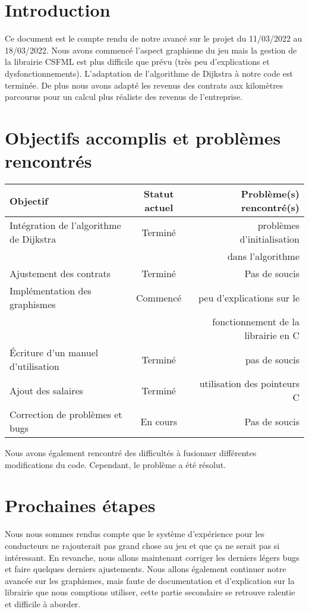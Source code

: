 \documentclass[a4paper, 12pt]{article}
\begin{document}
\newpage



\section*{Introduction}
      Ce document est le compte rendu de notre avancé sur le projet du 11/03/2022 au 18/03/2022. Nous avons commencé l'aspect graphisme du jeu mais la gestion de la librairie CSFML est plus difficile que prévu (très peu d'explications et dysfonctionnements). L'adaptation de l'algorithme de Dijkstra à notre code est terminée. De plus nous avons adapté les revenus des contrats aux kilomètres parcourus pour un calcul plus réaliste des revenus de l'entreprise.

\section{Objectifs accomplis et problèmes rencontrés}
     \begin{tabular}{|l|c|r|}
  \hline
  Objectif & Statut actuel & Problème(s) rencontré(s) \\
  \hline
   Intégration de l'algorithme de Dijkstra & Terminé & problèmes d'initialisation \\
   & & dans l'algorithme\\
   Ajustement des contrats & Terminé & Pas de soucis\\
   Implémentation des graphismes & Commencé & peu d'explications sur le \\
   & & fonctionnement de la librairie en C\\
   Écriture d'un manuel d'utilisation & Terminé & pas de soucis\\
   Ajout des salaires & Terminé & utilisation des pointeurs C\\
   Correction de problèmes et bugs & En cours & Pas de soucis\\
   
  \hline
\end{tabular}

\HRule

Nous avons également rencontré des difficultés à fusionner différentes modifications du code. Cependant, le problème a été résolut.

\section{Prochaines étapes}
    Nous nous sommes rendus compte que le système d'expérience pour les conducteurs ne rajouterait pas grand chose au jeu et que ça ne serait pas si intéressant. En revanche, nous allons maintenant corriger les derniers légers bugs et faire quelques derniers ajustements. Nous allons également continuer notre avancée sur les graphismes, mais faute de documentation et d'explication sur la librairie que nous comptions utiliser, cette partie secondaire se retrouve ralentie et difficile à aborder. 
    
\end{document}
